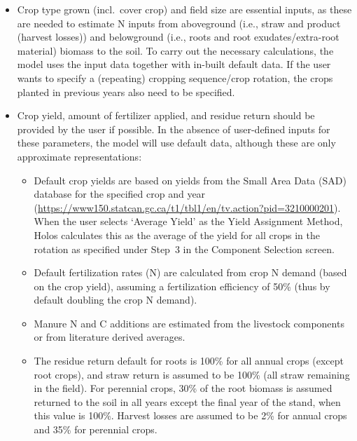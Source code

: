 \begin{itemize}[leftmargin=1.5em]
    \item Crop type grown (incl.\ cover crop) and field size are essential
          inputs, as these are needed to estimate N inputs from aboveground
          (i.e., straw and product (harvest losses)) and belowground (i.e.,
          roots and root exudates/extra-root material) biomass to the soil.
          To carry out the necessary calculations, the model uses the input
          data together with in-built default data. If the user wants to
          specify a (repeating) cropping sequence/crop rotation, the crops
          planted in previous years also need to be specified.

    \item Crop yield, amount of fertilizer applied, and residue return should
          be provided by the user if possible. In the absence of user-defined
          inputs for these parameters, the model will use default data,
          although these are only approximate representations:
          \begin{itemize}
              \item Default crop yields are based on yields from the Small
                    Area Data (SAD) database for the specified crop and year
                    (\url{https://www150.statcan.gc.ca/t1/tbl1/en/tv.action?pid=3210000201}).
                    When the user selects `Average Yield' as the Yield
                    Assignment Method, Holos calculates this as the average
                    of the yield for all crops in the rotation as specified
                    under Step~3 in the Component Selection screen.
              \item Default fertilization rates (N) are calculated from crop
                    N demand (based on the crop yield), assuming a
                    fertilization efficiency of 50\% (thus by default
                    doubling the crop N demand).
              \item Manure N and C additions are estimated from the livestock
                    components or from literature derived averages.
              \item The residue return default for roots is 100\% for all
                    annual crops (except root crops), and straw return is
                    assumed to be 100\% (all straw remaining in the field).
                    For perennial crops, 30\% of the root biomass is assumed
                    returned to the soil in all years except the final year
                    of the stand, when this value is 100\%. Harvest losses
                    are assumed to be 2\% for annual crops and 35\% for
                    perennial crops.
          \end{itemize}


\end{itemize}
